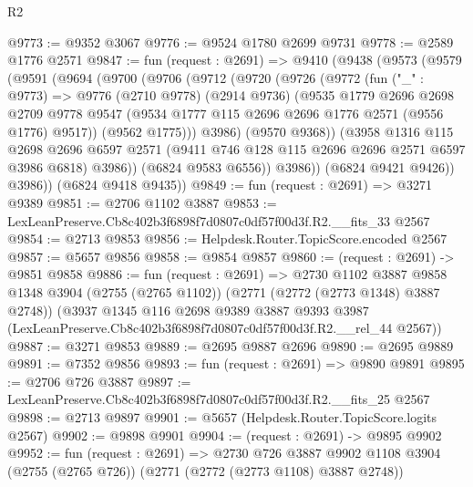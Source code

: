 \begin{lexlean}{R2}
\begin{coremodule}
@9773 := @9352 @3067
@9776 := @9524 @1780 @2699 @9731
@9778 := @2589 @1776 @2571
@9847 := fun (request : @2691) =>
  @9410
    (@9438
      (@9573
        (@9579
          (@9591
            (@9694
              (@9700
                (@9706
                  (@9712
                    (@9720
                      (@9726
                        (@9772
                          (fun ("_" : @9773) =>
                          @9776
                            (@2710 @9778)
                            (@2914 @9736)
                            (@9535
                              @1779
                              @2696
                              @2698
                              @2709
                              @9778
                              @9547
                              (@9534 @1777 @115 @2696 @2696 @1776 @2571 (@9556 @1776) @9517))
                            (@9562 @1775)))
                        @3986)
                      (@9570 @9368))
                    (@3958
                      @1316
                      @115
                      @2698
                      @2696
                      @6597
                      @2571
                      (@9411 @746 @128 @115 @2696 @2696 @2571 @6597 @3986 @6818)
                      @3986))
                  (@6824 @9583 @6556))
                @3986))
            (@6824 @9421 @9426))
          @3986))
      (@6824 @9418 @9435))
@9849 := fun (request : @2691) => @3271 @9389
@9851 := @2706 @1102 @3887
@9853 := LexLeanPreserve.Cb8c402b3f6898f7d0807c0df57f00d3f.R2.__fits_33 @2567
@9854 := @2713 @9853
@9856 := Helpdesk.Router.TopicScore.encoded @2567
@9857 := @5657 @9856
@9858 := @9854 @9857
@9860 := (request : @2691) -> @9851 @9858
@9886 := fun (request : @2691) =>
  @2730
    @1102
    @3887
    @9858
    @1348
    @3904
    (@2755 (@2765 @1102))
    (@2771 (@2772 (@2773 @1348) @3887 @2748))
    (@3937
      @1345
      @116
      @2698
      @9389
      @3887
      @9393
      @3987
      (LexLeanPreserve.Cb8c402b3f6898f7d0807c0df57f00d3f.R2.__rel_44 @2567))
@9887 := @3271 @9853
@9889 := @2695 @9887 @2696
@9890 := @2695 @9889
@9891 := @7352 @9856
@9893 := fun (request : @2691) => @9890 @9891
@9895 := @2706 @726 @3887
@9897 := LexLeanPreserve.Cb8c402b3f6898f7d0807c0df57f00d3f.R2.__fits_25 @2567
@9898 := @2713 @9897
@9901 := @5657 (Helpdesk.Router.TopicScore.logits @2567)
@9902 := @9898 @9901
@9904 := (request : @2691) -> @9895 @9902
@9952 := fun (request : @2691) =>
  @2730
    @726
    @3887
    @9902
    @1108
    @3904
    (@2755 (@2765 @726))
    (@2771 (@2772 (@2773 @1108) @3887 @2748))

\end{coremodule}
\end{lexlean}
